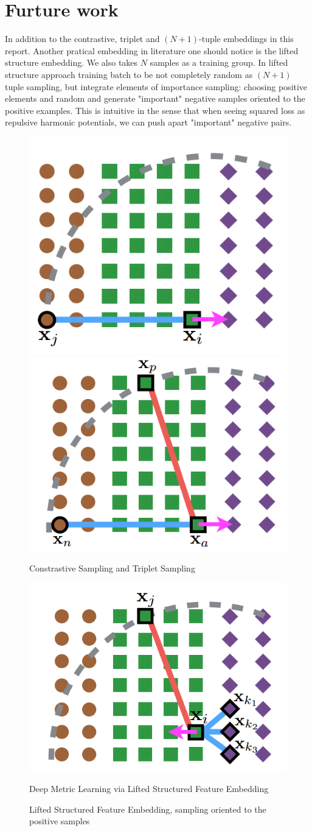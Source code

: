 \documentclass[10pt,twocolumn,letterpaper]{article}
\begin{document}
	\section{Furture work}
	In addition to the contrastive, triplet and $(N+1)$-tuple embeddings in this report. Another pratical embedding in literature one should notice is the lifted structure embedding. We also takes $N$ samples as a training group. In lifted structure approach training batch to be not completely random as $(N+1)$ tuple sampling, but integrate elements of importance sampling: choosing positive elements and random and generate "important" negative samples oriented to the positive examples. This is intuitive in the sense that when seeing squared loss as repulsive harmonic potentials, we can push apart "important" negative pairs. 
				\begin{figure}[t]
				
				\begin{center}
					\includegraphics[width=0.5\linewidth]{constrastiveDemo}\includegraphics[width=0.5\linewidth]{tripletDemo}
					\caption{Constrastive Sampling and Triplet Sampling}
					\includegraphics[width=0.5\linewidth]{liftedDemo}
					\caption{Lifted Structured Feature Embedding, sampling oriented to the positive samples}
				\end{center}
			Deep Metric Learning via Lifted Structured Feature Embedding
			\end{figure}
\end{document}
